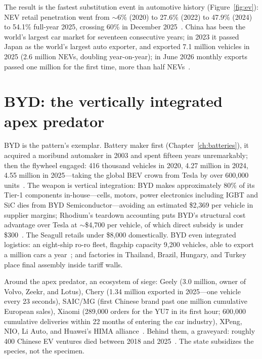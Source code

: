 

The result is the fastest substitution event in automotive history (Figure~\ref{fig:ev}): NEV retail penetration went from $\sim$6\% (2020) to 27.6\% (2022) to 47.9\% (2024) to 54.1\% full-year 2025, crossing 60\% in December 2025~\cite{cpca-2025}. China has been the world's largest car market for seventeen consecutive years; in 2023 it passed Japan as the world's largest auto exporter, and exported 7.1 million vehicles in 2025 (2.6 million NEVs, doubling year-on-year); in June 2026 monthly exports passed one million for the first time, more than half NEVs~\cite{caam-2025,exports-june-2026}.

\section{BYD: the vertically integrated apex predator}

BYD is the pattern's exemplar. Battery maker first (Chapter~\ref{ch:batteries}), it acquired a moribund automaker in 2003 and spent fifteen years unremarkably; then the flywheel engaged: 416 thousand vehicles in 2020, 4.27 million in 2024, 4.55 million in 2025---taking the global BEV crown from Tesla by over 600,000 units~\cite{byd-2025}. The weapon is vertical integration: BYD makes approximately 80\% of its Tier-1 components in-house---cells, motors, power electronics including IGBT and SiC dies from BYD Semiconductor---avoiding an estimated \$2,369 per vehicle in supplier margins; Rhodium's teardown accounting puts BYD's structural cost advantage over Tesla at $\sim$\$4,700 per vehicle, of which direct subsidy is under \$300~\cite{rhodium-evs}. The Seagull retails under \$8,000 domestically. BYD even integrated logistics: an eight-ship ro-ro fleet, flagship capacity 9,200 vehicles, able to export a million cars a year~\cite{byd-ships}; and factories in Thailand, Brazil, Hungary, and Turkey place final assembly inside tariff walls.

Around the apex predator, an ecosystem of siege: Geely (3.0 million, owner of Volvo, Zeekr, and Lotus), Chery (1.34 million exported in 2025---one vehicle every 23 seconds), SAIC/MG (first Chinese brand past one million cumulative European sales), Xiaomi (289,000 orders for the YU7 in its first hour; 600,000 cumulative deliveries within 22 months of entering the car industry), XPeng, NIO, Li Auto, and Huawei's HIMA alliance~\cite{chery,mg-million,xiaomi}. Behind them, a graveyard: roughly 400 Chinese EV ventures died between 2018 and 2025~\cite{shakeout}. The state subsidizes the species, not the specimen.

